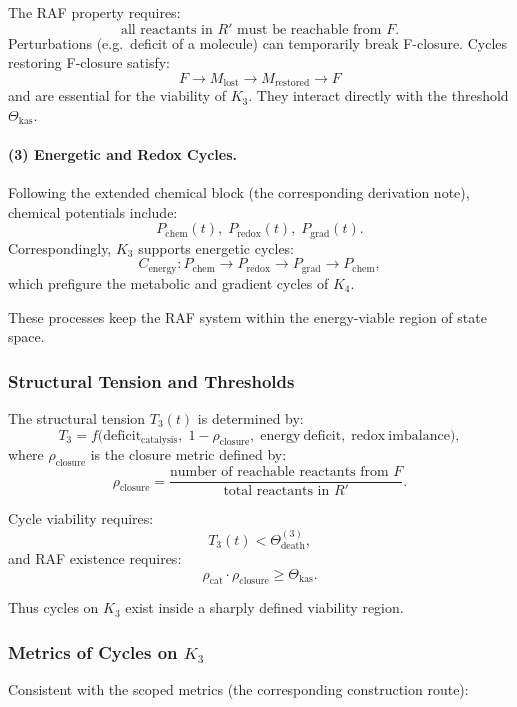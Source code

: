 The RAF property requires:
\[
  \text{all reactants in } R' \text{ must be reachable from } F.
\]
Perturbations (e.g.\ deficit of a molecule) can temporarily break
F-closure.
Cycles restoring F-closure satisfy:
\[
  F \to M_{\mathrm{lost}} \to M_{\mathrm{restored}} \to F
\]
and are essential for the viability of $K_3$.
They interact directly with the threshold $\Theta_{\mathrm{kas}}$.

\paragraph{(3) Energetic and Redox Cycles.}

Following the extended chemical block (the corresponding derivation note),
chemical potentials include:
\[
  P_{\mathrm{chem}}(t),\;
  P_{\mathrm{redox}}(t),\;
  P_{\mathrm{grad}}(t).
\]
Correspondingly, $K_3$ supports energetic cycles:
\[
  C_{\mathrm{energy}}: 
  P_{\mathrm{chem}}\to P_{\mathrm{redox}}
    \to P_{\mathrm{grad}} \to P_{\mathrm{chem}},
\]
which prefigure the metabolic and gradient cycles of $K_4$.

These processes keep the RAF system within the energy-viable region
of state space.

\subsubsection{Structural Tension and Thresholds}

The structural tension $T_3(t)$ is determined by:
\[
  T_3 = 
   f\bigl(
     \mathrm{deficit}_{\mathrm{catalysis}},\;
     1-\rho_{\mathrm{closure}},\;
     \mathrm{energy\ deficit},\;
     \mathrm{redox\ imbalance}
   \bigr),
\]
where $\rho_{\mathrm{closure}}$ is the closure metric defined by:
\[
  \rho_{\mathrm{closure}} =
    \frac{\text{number of reachable reactants from } F}
         {\text{total reactants in } R'}.
\]

Cycle viability requires:
\[
  T_3(t) < \Theta_{\mathrm{death}}^{(3)},
\]
and RAF existence requires:
\[
  \rho_{\mathrm{cat}} \cdot \rho_{\mathrm{closure}}
  \ge \Theta_{\mathrm{kas}}.
\]

Thus cycles on $K_3$ exist inside a sharply defined viability region.

\subsubsection{Metrics of Cycles on \texorpdfstring{$K_3$}{K_3}}

Consistent with the scoped metrics (the corresponding construction route):

